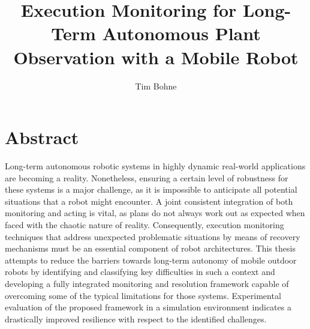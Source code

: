 \documentclass[english, master, utf8]{base/thesis_KBS}
\begin{document}
\setcounter{secnumdepth}{3}

\title{Execution Monitoring for Long-Term Autonomous Plant Observation with a Mobile Robot}
\author{Tim Bohne}

\generatetitle

\cleardoublepage

\chapter*{\hfill Abstract}
\begin{prefacesection}
\noindent
Long-term autonomous robotic systems in highly dynamic real-world applications are becoming a reality.
Nonetheless, ensuring a certain level of robustness for these systems is a major challenge, as it is
impossible to anticipate all potential situations that a robot might encounter. A joint consistent
integration of both monitoring and acting is vital, as plans do not always work out as expected when
faced with the chaotic nature of reality. Consequently, execution monitoring techniques that address
unexpected problematic situations by means of recovery mechanisms must be an essential component of
robot architectures. This thesis attempts to reduce the barriers towards long-term autonomy of mobile
outdoor robots by identifying and classifying key difficulties in such a context and developing a fully
integrated monitoring and resolution framework capable of overcoming some of the typical limitations for
those systems. Experimental evaluation of the proposed framework in a simulation environment indicates a
drastically improved resilience with respect to the identified challenges.
\vfill
\end{prefacesection}


\end{document}

